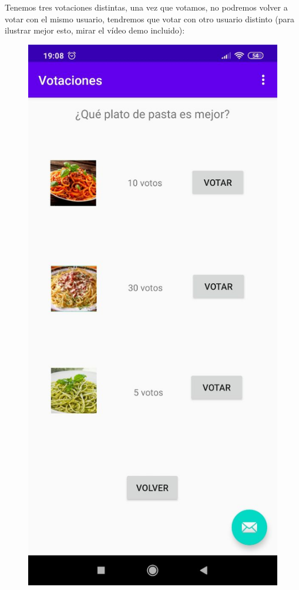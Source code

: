 \documentclass{article}
\begin{document}
 	Tenemos tres votaciones distintas, una vez que votamos, no podremos volver a votar con el mismo usuario, tendremos que votar con otro usuario distinto (para ilustrar mejor esto, mirar el vídeo demo incluido):
 	\begin{figure}[H]
 		\centering
 		\includegraphics[totalheight=8cm]{img/android5}
 	\end{figure}
\end{document}
